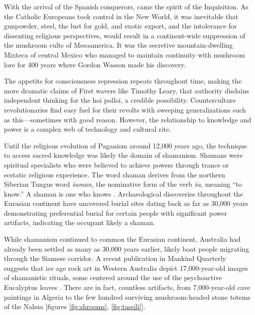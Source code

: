 \documentclass{UIdahoMastersThesis}
\begin{document}
With the arrival of the Spanish conquerors, came the spirit of the Inquisition. As the Catholic Europeans took control in the New World, it was inevitable that gunpowder, steel, the lust for gold, and exotic export, and the intolerance for dissenting religious perspectives, would result in a continent-wide suppression of the mushroom cults of Mesoamerica. It was the secretive mountain-dwelling Mixteca of central Mexico who managed to maintain continuity with mushroom lore for 400 years where Gordon Wasson made his discovery. 

The appetite for consciousness repression repeats throughout time, making the more dramatic claims of First wavers like Timothy Leary, that authority disdains independent thinking for the hoi polloi, a credible possibility. Counterculture revolutionaries find easy fuel for their revolts with sweeping generalizations such as this---sometimes with good reason. However, the relationship to knowledge and power is a complex web of technology and cultural rite. 

Until the religious evolution of Paganism around 12,000 years ago, the technique to access sacred knowledge was likely the domain of shamanism. Shamans were spiritual specialists who were believed to achieve powers through trance or ecstatic religious experience. The word shaman derives from the northern Siberian Tungus word \emph{\u{s}aman}, the nominative form of the verb \emph{\u{s}a}, meaning ``to know.'' A shaman is one who knows \cite{athope_early_nodate}. Archaeological discoveries throughout the Eurasian continent have uncovered burial sites dating back as far as 30,000 years demonstrating preferential burial for certain people with significant power artifacts, indicating the occupant likely a shaman.

While shamanism continued to common the Eurasian continent, Australia had already been settled as many as 30,000 years earlier, likely boat people migrating through the Siamese corridor. A recent publication in Mankind Quarterly suggests that ice age rock art in Western Australia depict 17,000-year-old images of shamanistic rituals, some centered around the use of the psychoactive Eucalyptus leaves \cite{michaelsen_australian_2000}. There are in fact, countless artifacts, from 7,000-year-old cave paintings in Algeria to the few hundred surviving mushroom-headed stone totems of the Nahua [figures \ref{fig:shrooms}, \ref{fig:tassili}].
\end{document}
